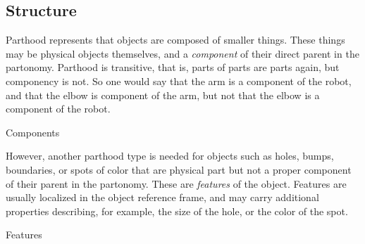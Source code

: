\subsection{Structure}

Parthood represents that objects are composed of smaller things.
These things may be physical objects themselves, and a \emph{component} of their direct parent in the partonomy.
Parthood is transitive, that is, parts of parts are parts again, but componency is not.
So one would say that the arm is a component of the robot, and that the elbow is component of the arm, but not that the elbow is a component of the robot.

\begin{ODP}{Components}
\end{ODP}

However, another parthood type is needed for objects such as holes, bumps, boundaries, or spots of color that are physical part but not a proper component of their parent in the partonomy.
These are \emph{features} of the object.
Features are usually localized in the object reference frame, and may carry additional properties describing, for example, the size of the hole, or the color of the spot.

\begin{ODP}{Features}
\end{ODP}

